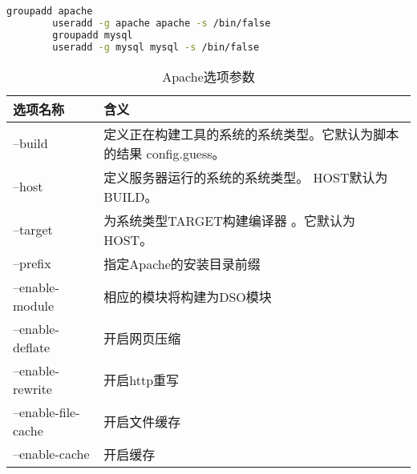 		\begin{lstlisting}[language=bash]
		groupadd apache
		useradd -g apache apache -s /bin/false
		groupadd mysql
		useradd -g mysql mysql -s /bin/false
		\end{lstlisting}
		\begin{table}[!htbp]
			\centering
			\begin{tabular}{ll}	
				\toprule
				选项名称& 含义\\
				\midrule
				--build&定义正在构建工具的系统的系统类型。它默认为脚本的结果 config.guess。\\
				--host&定义服务器运行的系统的系统类型。 HOST默认为BUILD。\\
				--target&为系统类型TARGET构建编译器 。它默认为HOST。\\
				--prefix& 指定Apache的安装目录前缀\\
				--enable-module&相应的模块将构建为DSO模块\\
				--enable-deflate&开启网页压缩\\
				--enable-rewrite&开启http重写\\
				--enable-file-cache&开启文件缓存\\
				--enable-cache&开启缓存\\
				\bottomrule
			\end{tabular}
		\caption{Apache选项参数}
		\end{table}
	